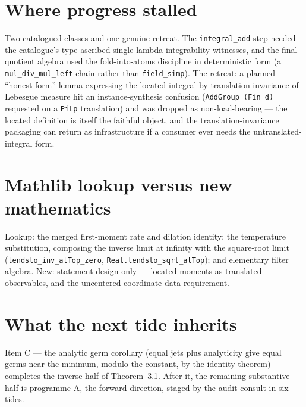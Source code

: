 \documentclass[11pt]{article}
\newcommand{\code}[1]{\texttt{#1}}
\begin{document}
\section{Where progress stalled}

Two catalogued classes and one genuine retreat. The
\code{integral\_add} step needed the catalogue's type-ascribed
single-lambda integrability witnesses, and the final quotient
algebra used the fold-into-atoms discipline in deterministic form (a
\code{mul\_div\_mul\_left} chain rather than \code{field\_simp}).
The retreat: a planned ``honest form'' lemma expressing the located
integral by translation invariance of Lebesgue measure hit an
instance-synthesis confusion (\code{AddGroup (Fin d)} requested on a
\code{PiLp} translation) and was dropped as non-load-bearing --- the
located definition is itself the faithful object, and the
translation-invariance packaging can return as infrastructure if a
consumer ever needs the untranslated-integral form.

\section{Mathlib lookup versus new mathematics}

Lookup: the merged first-moment rate and dilation identity; the
temperature substitution, composing the inverse limit at infinity
with the square-root limit (\code{tendsto\_inv\_atTop\_zero},
\code{Real.tendsto\_sqrt\_atTop}); and elementary filter algebra.
New: statement design only --- located moments as translated
observables, and the uncentered-coordinate data requirement.

\section{What the next tide inherits}

Item C --- the analytic germ corollary (equal jets plus analyticity
give equal germs near the minimum, modulo the constant, by the
identity theorem) --- completes the inverse half of Theorem~3.1.
After it, the remaining substantive half is programme A, the forward
direction, staged by the audit consult in six tides.
\end{document}
